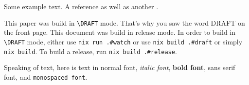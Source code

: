 




\maketitle

Some example text. A reference \parencite{src1} as well as another
\parencite{src2}.

\ifdefined\DRAFT
This paper was build in \verb|\DRAFT| mode. That's why you saw the word DRAFT
on the front page.
\else
This document was build in release mode.
\fi
In order to build in \verb|\DRAFT| mode, either use \verb|nix run .#watch| or
use \verb|nix build .#draft| or simply \verb|nix build|. To build a release, run
\verb|nix build .#release|.

Speaking of text, here is text in normal font, \textit{italic font},
\textbf{bold font}, \textsf{sans serif font}, and \texttt{monospaced font}.

\printbibliography


